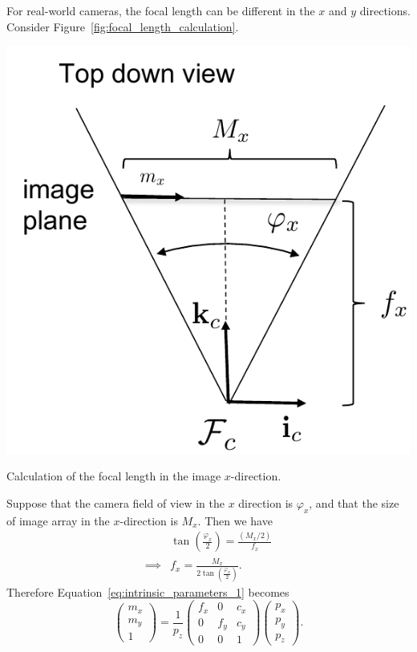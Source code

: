 For real-world cameras, the focal length can be different in the $x$ and $y$ directions.  Consider Figure~\ref{fig:focal_length_calculation}.
\begin{marginfigure}
  \includegraphics[width=\linewidth]{chap6_camera_features/figures/focal_length_calc}
  \caption{Calculation of the focal length in the image $x$-direction.}
  \label{fig:focal_length_calculation}  
\end{marginfigure}
Suppose that the camera field of view in the $x$ direction is $\varphi_x$, and that the size of image array in the $x$-direction is $M_x$.  Then we have 
\begin{align*}
& \tan\left(\frac{\varphi_x}{2}\right) = \frac{(M_x/2)}{f_x} \\
\implies & f_x = \frac{M_x}{2\tan\left(\frac{\varphi_x}{2}\right)}.
\end{align*}
Therefore Equation~\eqref{eq:intrinsic_parameters_1} becomes
\[
\begin{pmatrix}m_x \\ m_y \\ 1\end{pmatrix} 
	= \frac{1}{p_z}\begin{pmatrix} f_x & 0 & c_x \\ 0 & f_y & c_y \\ 0 & 0 & 1 \end{pmatrix}\begin{pmatrix}p_x \\ p_y \\ p_z \end{pmatrix}.
\]
